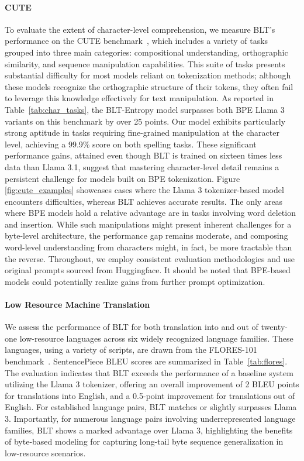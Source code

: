 \paragraph{CUTE}
To evaluate the extent of character-level comprehension, we measure {\textsc BLT}'s performance on the CUTE benchmark~\citep{edman2024cute}, which includes a variety of tasks grouped into three main categories: compositional understanding, orthographic similarity, and sequence manipulation capabilities. This suite of tasks presents substantial difficulty for most models reliant on tokenization methods; although these models recognize the orthographic structure of their tokens, they often fail to leverage this knowledge effectively for text manipulation. As reported in Table~\ref{tab:char_tasks}, the {\textsc BLT}-Entropy model surpasses both BPE Llama 3 variants on this benchmark by over 25 points. Our model exhibits particularly strong aptitude in tasks requiring fine-grained manipulation at the character level, achieving a 99.9\% score on both spelling tasks. These significant performance gains, attained even though {\textsc BLT} is trained on sixteen times less data than Llama 3.1, suggest that mastering character-level detail remains a persistent challenge for models built on BPE tokenization. Figure \ref{fig:cute_examples} showcases cases where the Llama 3 tokenizer-based model encounters difficulties, whereas {\textsc BLT} achieves accurate results. The only areas where BPE models hold a relative advantage are in tasks involving word deletion and insertion. While such manipulations might present inherent challenges for a byte-level architecture, the performance gap remains moderate, and composing word-level understanding from characters might, in fact, be more tractable than the reverse. Throughout, we employ consistent evaluation methodologies and use original prompts sourced from Huggingface. It should be noted that BPE-based models could potentially realize gains from further prompt optimization.

\paragraph{Low Resource Machine Translation} We assess the performance of {\textsc BLT} for both translation into and out of twenty-one low-resource languages across six widely recognized language families. These languages, using a variety of scripts, are drawn from the FLORES-101 benchmark~\citep{goyal2022flores}. SentencePiece BLEU scores are summarized in Table~\ref{tab:flores}. The evaluation indicates that {\textsc BLT} exceeds the performance of a baseline system utilizing the Llama 3 tokenizer, offering an overall improvement of 2 BLEU points for translations into English, and a 0.5-point improvement for translations out of English. For established language pairs, {\textsc BLT} matches or slightly surpasses Llama 3. Importantly, for numerous language pairs involving underrepresented language families, {\textsc BLT} shows a marked advantage over Llama 3, highlighting the benefits of byte-based modeling for capturing long-tail byte sequence generalization in low-resource scenarios.

